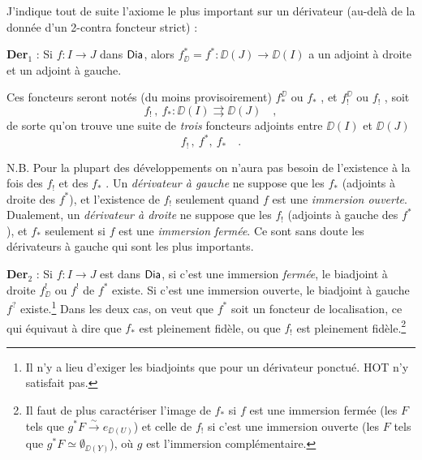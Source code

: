 
J'indique tout de suite l'axiome le plus important sur un dérivateur (au-delà de la donnée d'un 2-contra foncteur strict) :

\textbf{Der}$_1$ : Si $f : I \to J$ dans $\mathsf{Dia}$, alors $f^*_{\DD} = f^* : \DD(J) \to \DD(I)$ a un adjoint à droite et un adjoint à gauche.

Ces foncteurs seront notés (du moins provisoirement) $f^{\DD}_*$ ou $f_*$ , et $f^{\DD}_!$ ou $f_!$ , soit
\[ f_! \, , \ f_* : \DD(I) \rightrightarrows \DD(J) \quad , \]
de sorte qu'on trouve une suite de \textit{trois} foncteurs adjoints entre $\DD(I)$ et $\DD(J)$
\[ f_! \, , \ f^*, \ f_* \quad . \]

N.B. Pour la plupart des développements on n'aura pas besoin de l'existence à la fois des $f_!$ et des $f_*$ . Un \textit{dérivateur à gauche} ne suppose que les $f_*$ (adjoints à droite des $f^*$), et l'existence de $f_!$ seulement quand $f$ est une \textit{immersion ouverte}. Dualement, un \textit{dérivateur à droite} ne suppose que les $f_!$ (adjoints à gauche des $f^*$), et $f_*$ seulement si $f$ est une \textit{immersion fermée}. Ce sont sans doute les dérivateurs à gauche qui sont les plus importants.


\textbf{Der}$_2$ : Si $f : I \to J$ est dans $\mathsf{Dia}$, si c'est une immersion \textit{fermée}, le biadjoint à droite $f^!_{\DD}$ ou $f^!$ de $f^*$ existe. Si c'est une immersion ouverte, le biadjoint à gauche $f^?$ existe.\footnote{Il n'y a lieu d'exiger les biadjoints que pour un dérivateur ponctué. \textsf{HOT} n'y satisfait pas.} Dans
les deux cas, on veut que $f^*$ soit un foncteur de localisation, ce qui équivaut à dire que $f_*$ est pleinement fidèle, ou que $f_!$ est pleinement fidèle.\footnote{Il faut de plus caractériser l'image de $f_*$ si $f$ est une immersion fermée (les $F$ tels que $g^*F \overset{\sim}{\to} e_{\DD(U)}$) et celle de $f_!$ si c'est une immersion ouverte (les $F$ tels que $g^*F \simeq \emptyset_{\DD(Y)}$), où $g$ est l'immersion complémentaire.}

